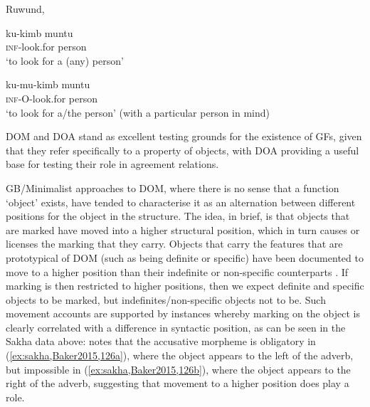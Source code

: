 \documentclass[output=paper
,modfonts
,nonflat]{langsci/langscibook}
\begin{document}
\begin{exe}
\ex Ruwund, \citet[][4]{woolford2001}  \label{ex:ruwund}
\begin{xlist}
\ex
{\gll ku-kimb muntu\\
\textsc{inf}-look.for person\\
\glt `to look for a (any) person'} \label{ex:ruwunda}

\ex
{\gll ku-mu-kimb muntu\\
\textsc{inf-O}-look.for person\\
\glt `to look for a/the person' (with a particular person in mind)}  \label{ex:ruwundb}
\end{xlist}
\end{exe}

\noindent DOM and DOA stand as excellent testing grounds for the existence of GFs, given that they refer specifically to a property of objects, with DOA providing a useful base for testing their role in agreement relations.

GB/Minimalist approaches to DOM, where there is no sense that a function `object' exists, have tended to characterise it as an alternation between different positions for the object in the structure.
The idea, in brief, is that objects that are marked have moved into a higher structural position, which in turn causes or licenses the marking that they carry. Objects that carry the features that are prototypical of DOM (such as being definite or specific) have been documented to move to a higher position than their indefinite or non-specific counterparts \parencite{Diesing1992}. 
If marking is then restricted to higher positions, then we expect definite and specific objects to be marked, but indefinites/non-specific objects not to be.
Such movement accounts are supported by instances whereby marking on the object is clearly correlated with a difference in syntactic position, as can be seen in the Sakha data above: \citeauthor{Baker2015} notes that the accusative morpheme is obligatory in
(\ref{ex:sakha,Baker2015,126a}), where the object appears to the left of the adverb, but impossible in (\ref{ex:sakha,Baker2015,126b}), where the object appears to the right of the adverb, suggesting that movement to a higher position does play a role.
\end{document}
